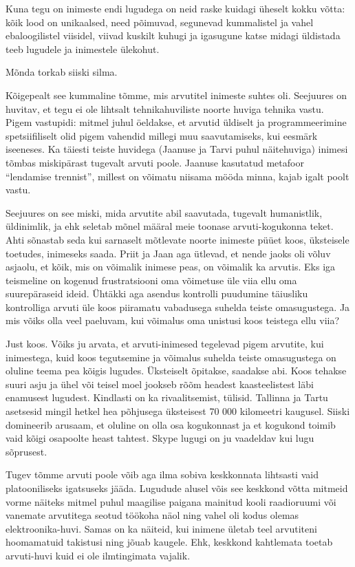 Kuna tegu on inimeste endi lugudega on neid raske kuidagi üheselt kokku võtta: kõik lood on unikaalsed, need põimuvad, segunevad kummalistel ja vahel ebaloogilistel viisidel, viivad kuskilt kuhugi ja igasugune katse midagi üldistada teeb lugudele ja inimestele ülekohut. 

Mõnda  torkab siiski silma. 

Kõigepealt see kummaline tõmme, mis arvutitel inimeste suhtes oli. Seejuures on huvitav, et tegu ei ole lihtsalt tehnikahuviliste noorte huviga tehnika vastu. Pigem vastupidi: mitmel juhul öeldakse, et arvutid üldiselt ja programmeerimine spetsiifiliselt olid pigem vahendid millegi muu saavutamiseks, kui eesmärk iseeneses. Ka täiesti teiste huvidega (Jaanuse ja Tarvi puhul näitehuviga) inimesi tõmbas miskipärast tugevalt arvuti poole. Jaanuse kasutatud metafoor \enquote{lendamise trennist}, millest on võimatu niisama mööda minna, kajab igalt poolt vastu. 

Seejuures on see miski, mida arvutite abil saavutada, tugevalt humanistlik, üldinimlik, ja ehk seletab mõnel määral meie toonase arvuti-kogukonna teket. Ahti sõnastab seda kui sarnaselt mõtlevate noorte inimeste püüet koos, üksteisele toetudes, inimeseks saada. Priit ja Jaan aga ütlevad, et nende jaoks oli võluv asjaolu, et kõik, mis on võimalik inimese peas, on võimalik ka arvutis. Eks iga teismeline on kogenud frustratsiooni oma võimetuse üle viia ellu oma suurepäraseid ideid. Ühtäkki aga asendus kontrolli puudumine  täiusliku kontrolliga arvuti üle koos piiramatu vabadusega suhelda teiste omasugustega.  Ja mis võiks olla veel paeluvam, kui võimalus oma unistusi koos teistega ellu viia?

Just koos. Võiks ju arvata, et arvuti-inimesed tegelevad pigem arvutite, kui inimestega, kuid koos tegutsemine ja võimalus suhelda teiste omasugustega on oluline teema pea kõigis lugudes. Üksteiselt õpitakse, saadakse abi. Koos tehakse suuri asju ja ühel või teisel moel jookseb rõõm headest kaasteelistest läbi enamusest lugudest. Kindlasti on ka rivaalitsemist, tülisid. Tallinna ja Tartu asetsesid mingil hetkel hea põhjusega üksteisest 70 000 kilomeetri kaugusel. Siiski domineerib arusaam, et oluline on olla osa kogukonnast ja et kogukond toimib vaid kõigi osapoolte heast tahtest. Skype lugugi on ju vaadeldav kui lugu sõprusest.

Tugev tõmme arvuti poole võib  aga ilma sobiva keskkonnata lihtsasti vaid platooniliseks igatsuseks jääda. Lugudude alusel  võis see keskkond võtta mitmeid vorme näiteks mitmel puhul maagilise paigana mainitud kooli raadioruumi või vanemate arvutitega seotud töökoha näol ning vahel oli kodus olemas elektroonika-huvi. Samas on ka näiteid, kui inimene ületab teel arvutiteni hoomamatuid takistusi ning jõuab kaugele. Ehk, keskkond kahtlemata toetab arvuti-huvi kuid ei ole ilmtingimata vajalik.


